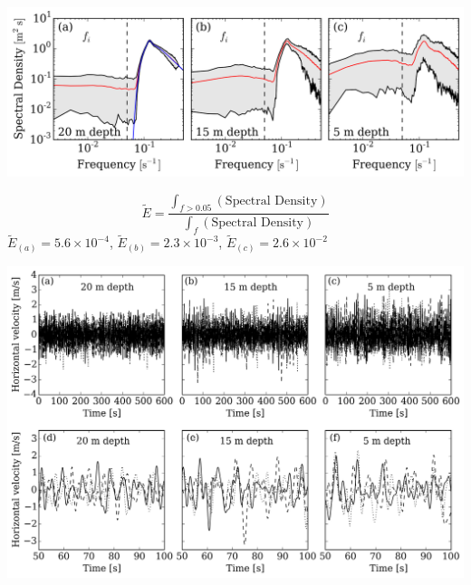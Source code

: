 \documentclass{beamer}
\newcommand{\topline}{%
 \tikz[remember picture,overlay] {%
   \draw[black!100] ([yshift=-1cm]current page.north west)
            --([yshift=-1cm,xshift=\paperwidth]current page.north west);}}
\begin{document}
\begin{frame}[t]%
\begin{center}
\includegraphics[scale=0.47]{FigRiset.png}

\begin{equation}
\tilde{E}=\frac{\int_{f>0.05}(\textrm{Spectral Density})}{\int_{f}(\textrm{Spectral Density})} \nonumber
\end{equation}
$\tilde{E}_{(a)} = 5.6\times 10^{-4}$, $\tilde{E}_{(b)} = 2.3\times10^{-3}$, $\tilde{E}_{(c)} = 2.6\times 10^{-2}$
\end{center}
\end{frame}



\begin{frame}[c]%
\vspace{-0.75cm}
\begin{center}
\includegraphics[scale=0.43]{WaveveloRealit.png}
\end{center}
\end{frame}
\end{document}
